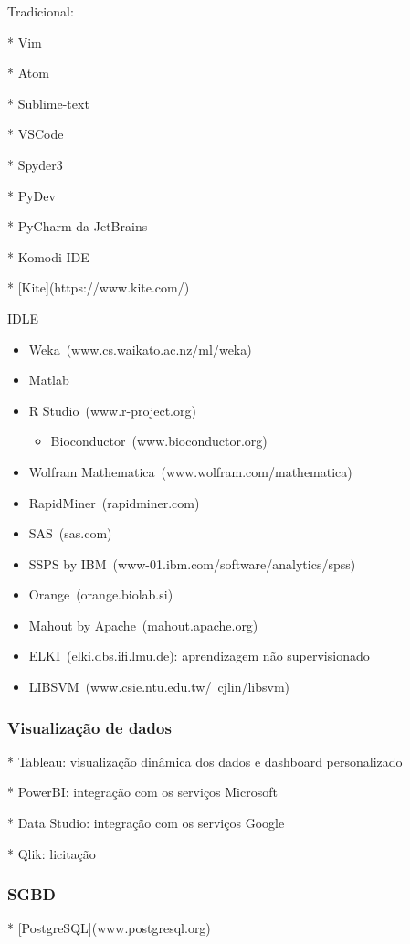 Tradicional:

* Vim

* Atom

* Sublime-text

* VSCode

* Spyder3

* PyDev

* PyCharm da JetBrains

* Komodi IDE

* [Kite](https://www.kite.com/)


IDLE
\begin{itemize}
	\item Weka~(www.cs.waikato.ac.nz/ml/weka)
	\item Matlab
	\item R Studio~(www.r-project.org)
	      \begin{itemize}
		      \item Bioconductor~(www.bioconductor.org)
	      \end{itemize}
	\item Wolfram Mathematica~(www.wolfram.com/mathematica)
	\item RapidMiner~(rapidminer.com)
	\item SAS~(sas.com)
	\item SSPS by IBM~(www-01.ibm.com/software/analytics/spss)
	\item Orange~(orange.biolab.si)
	\item Mahout by Apache~(mahout.apache.org)
	\item ELKI~(elki.dbs.ifi.lmu.de): aprendizagem não supervisionado
	\item LIBSVM~(www.csie.ntu.edu.tw/~cjlin/libsvm)
\end{itemize}


\subsubsection*{Visualização de dados}
* Tableau: visualização dinâmica dos dados e dashboard personalizado

* PowerBI: integração com os serviços Microsoft

* Data Studio: integração com os serviços Google

* Qlik: licitação 


\subsubsection*{SGBD}

* [PostgreSQL](www.postgresql.org)

